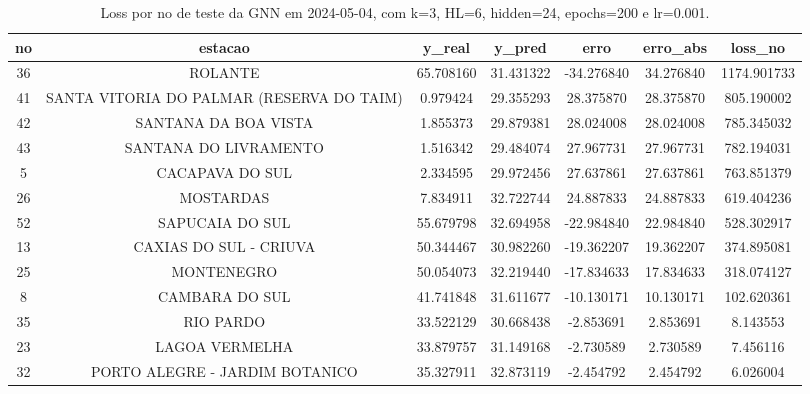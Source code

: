 \begin{table}[h]
\centering
\caption{Loss por no de teste da GNN em 2024-05-04, com k=3, HL=6, hidden=24, epochs=200 e lr=0.001.}
\label{tab:gnn_loss_k3_hl6_h24_e200_d20240504}
\begin{tabular}{ccccccc}
\toprule
no & estacao & y\_real & y\_pred & erro & erro\_abs & loss\_no \\
\midrule
36 & ROLANTE & 65.708160 & 31.431322 & -34.276840 & 34.276840 & 1174.901733 \\
41 & SANTA VITORIA DO PALMAR (RESERVA DO TAIM) & 0.979424 & 29.355293 & 28.375870 & 28.375870 & 805.190002 \\
42 & SANTANA DA BOA VISTA & 1.855373 & 29.879381 & 28.024008 & 28.024008 & 785.345032 \\
43 & SANTANA DO LIVRAMENTO & 1.516342 & 29.484074 & 27.967731 & 27.967731 & 782.194031 \\
5 & CACAPAVA DO SUL & 2.334595 & 29.972456 & 27.637861 & 27.637861 & 763.851379 \\
26 & MOSTARDAS & 7.834911 & 32.722744 & 24.887833 & 24.887833 & 619.404236 \\
52 & SAPUCAIA DO SUL & 55.679798 & 32.694958 & -22.984840 & 22.984840 & 528.302917 \\
13 & CAXIAS DO SUL - CRIUVA & 50.344467 & 30.982260 & -19.362207 & 19.362207 & 374.895081 \\
25 & MONTENEGRO & 50.054073 & 32.219440 & -17.834633 & 17.834633 & 318.074127 \\
8 & CAMBARA DO SUL & 41.741848 & 31.611677 & -10.130171 & 10.130171 & 102.620361 \\
35 & RIO PARDO & 33.522129 & 30.668438 & -2.853691 & 2.853691 & 8.143553 \\
23 & LAGOA VERMELHA & 33.879757 & 31.149168 & -2.730589 & 2.730589 & 7.456116 \\
32 & PORTO ALEGRE - JARDIM BOTANICO & 35.327911 & 32.873119 & -2.454792 & 2.454792 & 6.026004 \\
\bottomrule
\end{tabular}
\end{table}
